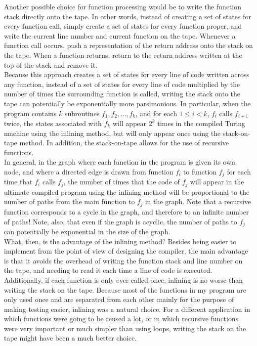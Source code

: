 Another possible choice for function processing would be to write the function stack directly onto the tape. In other words, instead of creating a set of states for every function call, simply create a set of states for every function proper, and write the current line number and current function on the tape. Whenever a function call occurs, push a representation of the return address onto the stack on the tape. When a function returns, return to the return address written at the top of the stack and remove it. \\

Because this approach creates a set of states for every line of code written across any function, instead of a set of states for every line of code multiplied by the number of times the surrounding function is called, writing the stack onto the tape can potentially be exponentially more parsimonious. In particular, when the program contains $k$ subroutines $f_1, f_2, \dots, f_k$, and for each $1 \le i < k$, $f_i$ calls $f_{i+1}$ twice, the states associated with $f_k$ will appear $2^k$ times in the compiled Turing machine using the inlining method, but will only appear once using the stack-on-tape method. In addition, the stack-on-tape allows for the use of recursive functions.\\

In general, in the graph where each function in the program is given its own node, and where a directed edge is drawn from function $f_i$ to function $f_j$ for each time that $f_i$ calls $f_j$, the number of times that the code of $f_j$ will appear in the ultimate compiled program using the inlining method will be proportional to the number of paths from the main function to $f_j$ in the graph. Note that a recursive function corresponds to a cycle in the graph, and therefore to an infinite number of paths! Note, also, that even if the graph is acyclic, the number of paths to $f_j$ can potentially be exponential in the size of the graph. \\

What, then, is the advantage of the inlining method? Besides being easier to implement from the point of view of designing the compiler, the main advantage is that it avoids the overhead of writing the function stack and line number on the tape, and needing to read it each time a line of code is executed. Additionally, if each function is only ever called once, inlining is no worse than writing the stack on the tape. Because most of the functions in my program are only used once and are separated from each other mainly for the purpose of making testing easier, inlining was a natural choice. For a different application in which functions were going to be reused a lot, or in which recursive functions were very important or much simpler than using loops, writing the stack on the tape might have been a much better choice. \\

